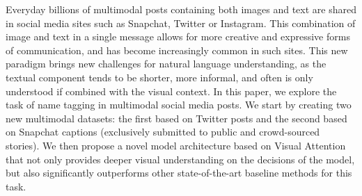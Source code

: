 Everyday billions of multimodal posts containing both images and text are shared in social media sites such as Snapchat, Twitter or Instagram. This combination of image and text in a single message allows for more creative and expressive forms of communication, and has become increasingly common in such sites. This new paradigm brings new challenges for natural language understanding, as the textual component tends to be shorter, more informal, and often is only understood if combined with the visual context. In this paper, we explore the task of name tagging in multimodal social media posts. We start by creating two new multimodal datasets: the first based on Twitter posts and the second based on Snapchat captions (exclusively submitted to public and crowd-sourced stories). We then propose a novel model architecture based on Visual Attention that not only provides deeper visual understanding on the decisions of the model, but also significantly outperforms other state-of-the-art baseline methods for this task.
